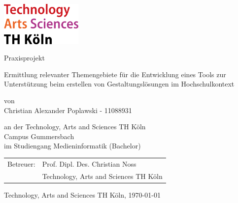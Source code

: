 
\begin{titlepage}

\begin{center}

\includegraphics[width=0.3\textwidth]{images/TH_Koeln_Logo.png}\\

\vspace*{1cm}

\begin{Huge}
Praxisprojekt\\
\end{Huge}

\vspace*{0.5cm}

\begin{LARGE}
Ermittlung relevanter Themengebiete für die Entwicklung eines Tools zur Unterstützung beim erstellen von Gestaltungslösungen im Hochschulkontext
\end{LARGE}

\vspace*{1.5cm}

\begin{large}
	von\\
    Christian Alexander Poplawski - 11088931\\

\vspace{1.0cm}

	an der Technology, Arts and Sciences TH Köln\\
    Campus Gummersbach\\
    im Studiengang Medieninformatik (Bachelor)\\

\vspace{1.0cm}

    \begin{tabular}{rl}
        Betreuer:  &  Prof. Dipl. Des. Christian Noss\\
       			   &  \small Technology, Arts and Sciences TH Köln \\[1.0em]

	\end{tabular}

\end{large}

\vspace{1.5cm}

Technology, Arts and Sciences TH Köln, \today \\


\vfill
\end{center}

\end{titlepage}
